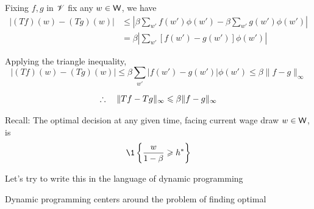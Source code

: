 \begin{frame}
    
    Fixing $f, g$ in $\mathscr V$ fix any $w \in \mathsf W$, we have 
    \begin{align*}
        |(Tf)(w) - (Tg)(w)|
        & \leq \left|
        \beta \sum_{w'} f(w') \phi(w')
                -
                \beta \sum_{w'} g(w') \phi(w')  
            \right|
        \\
        & = \beta 
            \left|
            \sum_{w'} [f(w') - g(w')] \phi(w') 
            \right|
    \end{align*}

    Applying the triangle inequality,
    \begin{equation*}
        |(Tf)(w) - (Tg)(w)|
        \leq \beta \sum_{w'} |f(w') - g(w')| \phi(w') 
        \leq \beta \| f - g \|_\infty 
    \end{equation*}

    \begin{equation*}
        \therefore \quad
        \|Tf - Tg \|_\infty \leqslant \beta \| f - g \|_\infty 
    \end{equation*}

\end{frame}

\begin{frame}
    
    Recall: The optimal decision at any given time, facing current wage draw $w \in
    \mathsf W$, is 
    \begin{equation*}
        \1 \left\{ \frac{w}{1-\beta} \geq h^* \right\}
    \end{equation*}

    \vspace{1em}

    Let's try to write this in the language of dynamic programming
    
    \vspace{1em}

    Dynamic programming centers around the problem of finding optimal

\end{frame}


